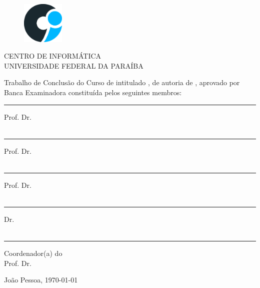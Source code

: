 \newpage
\begin{figure}[H]
\centering
\includegraphics[width=2cm]{img/logo-ci.png}
\end{figure}

\begin{center}
CENTRO DE INFORMÁTICA \\
UNIVERSIDADE FEDERAL DA PARAÍBA
\end{center}

\vspace{1cm}

\noindent Trabalho de Conclusão do Curso de \nomedocurso intitulado \textit{\bf \em \thetitle}, de autoria de \theauthor, aprovado por Banca Examinadora constituída pelos seguintes membros: \\

\vspace{0.5in}

\hrule
\noindent Prof. Dr. \profa\\
\insta\\

\vspace{0.2in}

\hrule
\noindent Prof. Dr. \profb\\
\instb\\

\vspace{0.2in}

\hrule
\noindent Prof. Dr. \profc\\
\instc\\

\vspace{0.2in}

\hrule
\noindent Dr. \profd\\
\instd\\

\vspace{2cm}
\vfill

\hrule
\noindent Coordenador(a) do \departamento\\
Prof. Dr. \coordenador\\

\vfill

\begin{center}
João Pessoa, \today
\end{center}

